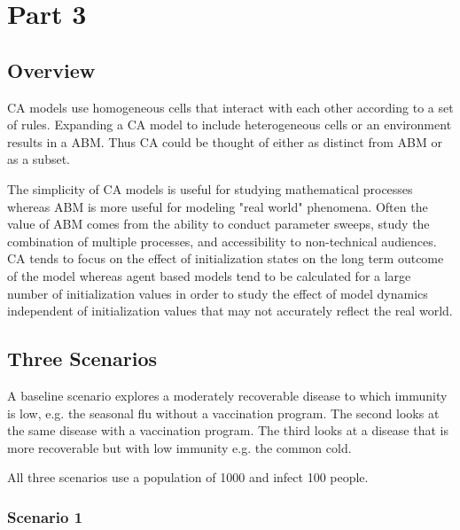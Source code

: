 \documentclass[11pt]{article} %
\begin{document}


\pagebreak

\section{Part 3}

\subsection{Overview}

CA models use homogeneous cells that interact with each other according to a set of rules. Expanding a CA model to include heterogeneous cells or an environment results in a ABM. Thus CA could be thought of either as distinct from ABM or as a subset. 
 
The simplicity of CA models is useful for studying mathematical processes whereas ABM is more useful for modeling  "real world" phenomena. Often the value of ABM comes from the ability to conduct parameter sweeps, study the combination of multiple processes, and accessibility to non-technical audiences. CA tends to focus on the effect of initialization states on the long term outcome of the model whereas agent based models tend to be calculated for a large number of initialization values in order to study the effect of model dynamics independent of initialization values that may not accurately reflect the real world. 

\subsection{Three Scenarios}

A baseline scenario explores a moderately recoverable disease to which immunity is low, e.g. the seasonal flu without a vaccination program. The second looks at the same disease with a vaccination program. The third looks at a disease that is more recoverable but with low immunity e.g. the common cold. 

All three scenarios use a population of 1000 and infect 100 people. 

\subsubsection{Scenario 1}
\end{document}

